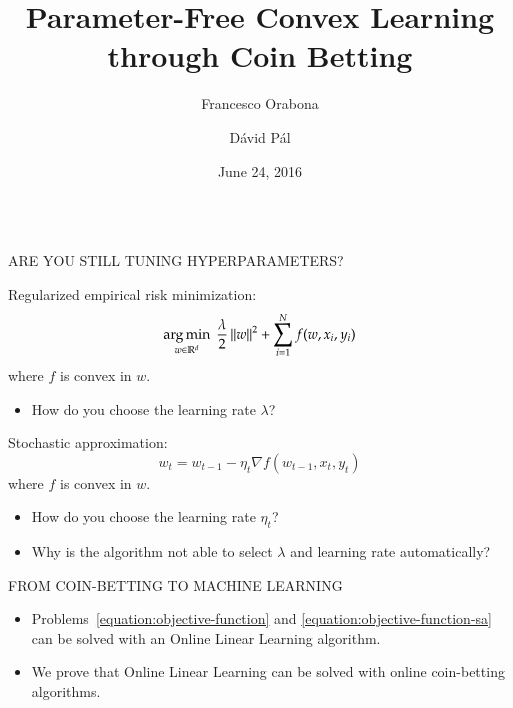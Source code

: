 \documentclass[final,t,serif,mathserif]{beamer}
\title{\huge Parameter-Free Convex Learning through Coin Betting}
\author{Francesco Orabona \and D\'avid P\'al}
\institute[] %
{
  Yahoo Research, New York
}
\date[June 24, 2016]{June 24, 2016}
\newcommand{\grad}{\nabla}
\def\blockspacea{\vspace{0.cm}}
\begin{document}
\begin{frame}{}

\begin{columns}[t]

\begin{column}{.33\linewidth}

    \begin{block}{ARE YOU STILL TUNING HYPERPARAMETERS?}
      \blockspacea
      
      Regularized empirical risk minimization:
      \begin{equation}
      \label{equation:objective-function}
         \operatorname*{arg\,min}_{w \in \mathbb{R}^d} \ \frac{\lambda}{2} \left\|{w}\right\|^2 + \sum_{i=1}^N f(w, x_i, y_i)
      \end{equation}
      where $f$ is convex in $w$.
      \begin{itemize}
      \item How do you choose the learning rate $\lambda$?
      \end{itemize}
      
      \vspace{1cm}
      
      Stochastic approximation:
      \begin{equation}
      \label{equation:objective-function-sa}
         w_t = w_{t-1} - \eta_t \grad f(w_{t-1}, x_t, y_t)
      \end{equation}
      where $f$ is convex in $w$.
      \begin{itemize}
      \item How do you choose the learning rate $\eta_t$?
      \end{itemize}
      
      \vspace{1cm}
      
      \begin{itemize}      
      \item \alert{Why is the algorithm not able to select $\lambda$ and learning rate automatically?}
      \end{itemize}
      
      \blockspacea
    \end{block}

    \begin{block}{FROM COIN-BETTING TO MACHINE LEARNING}
    \blockspacea
    
    \begin{itemize}
      \item Problems~\eqref{equation:objective-function} and \eqref{equation:objective-function-sa} can be solved with an Online Linear Learning algorithm.
      \item We prove that Online Linear Learning can be solved with online coin-betting algorithms.
    \end{itemize}


\end{block}
\end{column}
\end{columns}
\end{frame}
\end{document}
